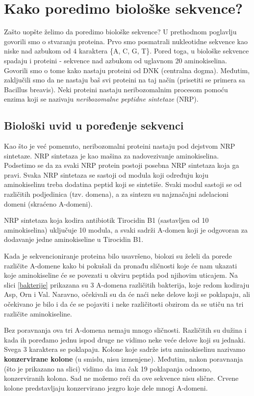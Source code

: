 \chapter{Kako poredimo biološke sekvence?}

Zašto uopšte želimo da poredimo biološke sekvence? U prethodnom poglavlju govorili smo o stvaranju proteina. Prvo smo posmatrali nukleotidne sekvence kao niske nad azbukom od 4 karaktera \{A, C, G, T\}. Pored toga, u biološke sekvence spadaju i proteini - sekvence nad azbukom od uglavnom 20 aminokiselina. Govorili smo o tome kako nastaju proteini od DNK (centralna dogma). Međutim, zaključili smo da ne nastaju baš svi proteini na taj način (prisetiti se primera sa Bacillus breavis). Neki proteini nastaju neribozomalnim procesom pomoću enzima koji se nazivaju \textit{neribozomalne peptidne sintetaze} (NRP). 

\section{Biološki uvid u poređenje sekvenci}

Kao što je već pomenuto, neribozomalni proteini nastaju pod dejstvom NRP sintetaze. NRP sintetaza je kao mašina za nadovezivanje aminokiselina. Podsetimo se da za svaki NRP protein postoji posebna NRP sintetaza koja ga pravi. Svaka NRP sintetaza se sastoji od modula koji određuju koju aminokiselinu treba dodatina peptid koji se sintetiše. Svaki modul sastoji se od različitih podjedinica  (tzv. domena), a za sintezu su najznačajni adelacioni domeni (skraćeno A-domeni).  

NRP sintetaza koja kodira antibiotik Tirocidin B1 (sastavljen od 10 aminokiselina) uključuje 10 modula, a svaki sadrži A-domen koji je odgovoran za dodavanje jedne aminokiseline u Tirocidin B1.

Kada je sekvencioniranje proteina bilo usavršeno, biolozi su želeli da porede različite A-domene kako bi pokušali da pronađu sličnosti koje će nam ukazati koje aminokiseline će se povezati u okviru peptida pod njihovim uticajem. 
Na slici \ref{bakterije} prikazana su 3 A-domena različitih bakterija, koje redom kodiraju Asp, Orn i Val. Naravno, očekivali su da će naći neke delove koji se poklapaju, ali očekivano je bilo i da će se pojaviti i neke različitosti obzirom da se utiču na tri različite aminokiseline. 

Bez poravnanja ova tri A-domena nemaju mnogo sličnosti. Različitih su dužina i kada ih poređamo jednu ispod druge ne vidimo neke  veće delove koji su jednaki. Svega 3 karaktera se poklapaju. Kolone koje sadrže istu aminokiselinu nazivamo \textbf{konzervirane kolone} (u smislu, nisu izmenjene). Međutim, nakon poravnanja (što je prikazano na slici) vidimo da ima čak 19 poklapanja odnosno, konzerviranih kolona. Sad ne možemo reći da ove sekvence nisu slične. Crvene kolone predstavljaju konzervirano jezgro koje dele mnogi A-domeni. 

